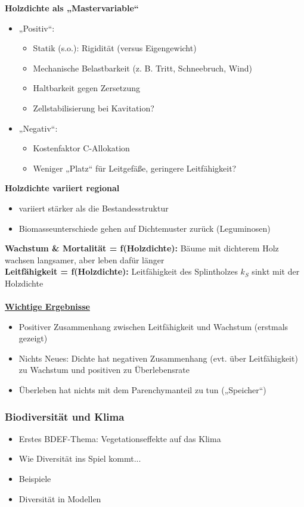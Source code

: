 \textbf{Holzdichte als „Mastervariable“}
\begin{itemize}
	\item „Positiv“:
	\begin{itemize}
		\item Statik (s.o.): Rigidität (versus Eigengewicht)
		\item Mechanische Belastbarkeit (z. B. Tritt, Schneebruch, Wind)
		\item Haltbarkeit gegen Zersetzung
		\item Zellstabilisierung bei Kavitation?
	\end{itemize}
	\item „Negativ“:
	\begin{itemize}
		\item Kostenfaktor C-Allokation
		\item Weniger „Platz“ für Leitgefäße, geringere Leitfähigkeit?
	\end{itemize}
\end{itemize}

\textbf{Holzdichte variiert regional}
\begin{itemize}
	\item variiert stärker als die Bestandesstruktur
	\item Biomasseunterschiede gehen auf Dichtemuster zurück (Leguminosen)
\end{itemize}

\textbf{Wachstum \& Mortalität = f(Holzdichte):} Bäume mit dichterem Holz wachsen langsamer, aber leben dafür länger\\
\textbf{Leitfähigkeit = f(Holzdichte):} Leitfähigkeit des Splintholzes $k_S$ sinkt mit der Holzdichte
\\\\
\underline{\textbf{Wichtige Ergebnisse}}
\begin{itemize}
	\item Positiver Zusammenhang zwischen Leitfähigkeit und Wachstum (erstmals gezeigt)
	\item Nichts Neues: Dichte hat negativen Zusammenhang (evt. über Leitfähigkeit) zu Wachstum und positiven zu Überlebensrate
	\item Überleben hat nichts mit dem Parenchymanteil zu tun („Speicher“)
\end{itemize}

\subsubsection{Biodiversität und Klima}
\begin{itemize}
	\item Erstes BDEF-Thema: Vegetationseffekte auf das Klima
	\item Wie Diversität ins Spiel kommt...
	\item Beispiele
	\item Diversität in Modellen
\end{itemize}


